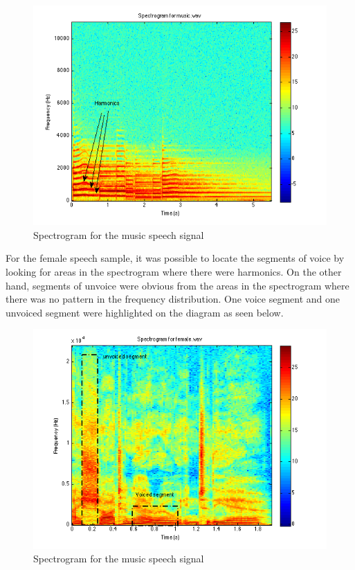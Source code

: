 \documentclass[11pt]{article}   %
\begin{document}
\begin{figure}[H]
\begin{center}
\leavevmode
\includegraphics[width=1\textwidth]{musicspect.png}
\end{center}
\caption{Spectrogram for the music speech signal}
\label{euler:1}
\end{figure}

For the female speech sample, it was possible to locate the segments of voice  by looking for areas in the spectrogram where there were harmonics. On the other hand, segments of unvoice were obvious from the areas in the spectrogram where there was no pattern in the frequency distribution. One voice segment and one unvoiced segment were highlighted on the diagram as seen below. 


\begin{figure}[H]
\begin{center}
\leavevmode
\includegraphics[width=1\textwidth]{femspect.png}
\end{center}
\caption{Spectrogram for the music speech signal}
\label{euler:1}
\end{figure}
\end{document}
